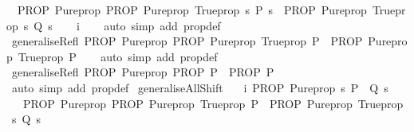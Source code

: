 \begin{isabellebody}
\ \ {\isachardoublequoteopen}PROP\ Pure{\isachardot}prop\ {\isacharparenleft}PROP\ Pure{\isachardot}prop\ {\isacharparenleft}Trueprop\ {\isacharparenleft}{\isasymexists}s{\isachardot}\ P\ s{\isacharparenright}{\isacharparenright}\ {\isasymLongrightarrow}\ PROP\ Pure{\isachardot}prop\ {\isacharparenleft}Trueprop\ {\isacharparenleft}{\isasymexists}s{\isachardot}\ Q\ s{\isacharparenright}{\isacharparenright}{\isacharparenright}{\isachardoublequoteclose}\isanewline
%
\isadelimproof
\ \ %
\endisadelimproof
%
\isatagproof
{}\isamarkupfalse%
\ i\isanewline
\ \ \isamarkupfalse%
\ {\isacharparenleft}auto\ simp\ add{\isacharcolon}\ prop{\isacharunderscore}def{\isacharparenright}%
\endisatagproof
{\isafoldproof}%
%
\isadelimproof
\isanewline
%
\endisadelimproof
\isanewline
\isanewline
{}\isamarkupfalse%
\ generaliseRefl{\isacharcolon}\ {\isachardoublequoteopen}PROP\ Pure{\isachardot}prop\ {\isacharparenleft}PROP\ Pure{\isachardot}prop\ {\isacharparenleft}Trueprop\ P{\isacharparenright}\ {\isasymLongrightarrow}\ PROP\ Pure{\isachardot}prop\ {\isacharparenleft}Trueprop\ P{\isacharparenright}{\isacharparenright}{\isachardoublequoteclose}\isanewline
%
\isadelimproof
\ \ %
\endisadelimproof
%
\isatagproof
{}\isamarkupfalse%
\ {\isacharparenleft}auto\ simp\ add{\isacharcolon}\ prop{\isacharunderscore}def{\isacharparenright}%
\endisatagproof
{\isafoldproof}%
%
\isadelimproof
\isanewline
%
\endisadelimproof
\isanewline
{}\isamarkupfalse%
\ generaliseRefl{\isacharprime}{\isacharcolon}\ {\isachardoublequoteopen}PROP\ Pure{\isachardot}prop\ {\isacharparenleft}PROP\ P\ {\isasymLongrightarrow}\ PROP\ P{\isacharparenright}{\isachardoublequoteclose}\isanewline
%
\isadelimproof
\ \ %
\endisadelimproof
%
\isatagproof
{}\isamarkupfalse%
\ {\isacharparenleft}auto\ simp\ add{\isacharcolon}\ prop{\isacharunderscore}def{\isacharparenright}%
\endisatagproof
{\isafoldproof}%
%
\isadelimproof
\isanewline
%
\endisadelimproof
\isanewline
{}\isamarkupfalse%
\ generaliseAllShift{\isacharcolon}\isanewline
\ \ \ i{\isacharcolon}\ {\isachardoublequoteopen}PROP\ Pure{\isachardot}prop\ {\isacharparenleft}{\isasymAnd}s{\isachardot}\ P\ {\isasymLongrightarrow}\ Q\ s{\isacharparenright}{\isachardoublequoteclose}\isanewline
\ \ \ {\isachardoublequoteopen}PROP\ Pure{\isachardot}prop\ {\isacharparenleft}PROP\ Pure{\isachardot}prop\ {\isacharparenleft}Trueprop\ P{\isacharparenright}\ {\isasymLongrightarrow}\ PROP\ Pure{\isachardot}prop\ {\isacharparenleft}Trueprop\ {\isacharparenleft}{\isasymforall}s{\isachardot}\ Q\ s{\isacharparenright}{\isacharparenright}{\isacharparenright}{\isachardoublequoteclose}\isanewline

\end{isabellebody}
